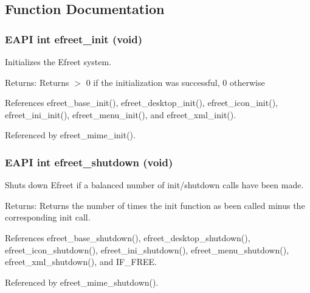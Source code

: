 \subsection{Function Documentation}
\subsubsection[efreet\_\-init]{\setlength{\rightskip}{0pt plus 5cm}EAPI int efreet\_\-init (void)}\label{efreet_8c_448e550a87271c7a74f8bf9963a8b81e}


Initializes the Efreet system. 

\begin{Desc}
\item[Returns:]Returns $>$ 0 if the initialization was successful, 0 otherwise \end{Desc}


References efreet\_\-base\_\-init(), efreet\_\-desktop\_\-init(), efreet\_\-icon\_\-init(), efreet\_\-ini\_\-init(), efreet\_\-menu\_\-init(), and efreet\_\-xml\_\-init().

Referenced by efreet\_\-mime\_\-init().
\subsubsection[efreet\_\-shutdown]{\setlength{\rightskip}{0pt plus 5cm}EAPI int efreet\_\-shutdown (void)}\label{efreet_8c_21312e3804b2ff4afed2e854b66ed827}


Shuts down Efreet if a balanced number of init/shutdown calls have been made. 

\begin{Desc}
\item[Returns:]Returns the number of times the init function as been called minus the corresponding init call. \end{Desc}


References efreet\_\-base\_\-shutdown(), efreet\_\-desktop\_\-shutdown(), efreet\_\-icon\_\-shutdown(), efreet\_\-ini\_\-shutdown(), efreet\_\-menu\_\-shutdown(), efreet\_\-xml\_\-shutdown(), and IF\_\-FREE.

Referenced by efreet\_\-mime\_\-shutdown().